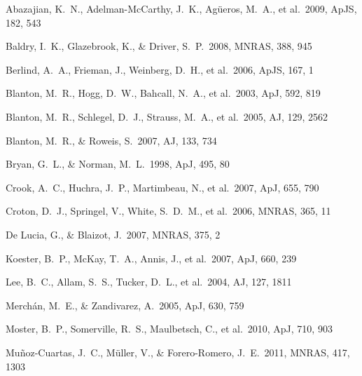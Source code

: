 \documentclass[useAMS,usenatbib]{mn2e}
\newcommand{\mnras}{MNRAS}
\newcommand{\apj}{ApJ}
\newcommand{\apjs}{ApJS}
\newcommand{\aj}{AJ}
\begin{document}
\begin{thebibliography}{99}

 Abazajian,
  K.~N., Adelman-McCarthy, J.~K., Ag{\"u}eros, M.~A., et al.\ 2009,
  \apjs, 182, 543

 Baldry, I.~K.,
  Glazebrook, K., \& Driver, S.~P.\ 2008, \mnras, 388, 945

 Berlind, A.~A.,
  Frieman, J., Weinberg, D.~H., et al.\ 2006, \apjs, 167, 1

 Blanton, M.~R.,
  Hogg, D.~W., Bahcall, N.~A., et al.\ 2003, \apj, 592, 819

 Blanton, M.~R.,
  Schlegel, D.~J., Strauss, M.~A., et al.\ 2005, \aj, 129, 2562

 Blanton, M.~R.,
  \& Roweis, S.\ 2007, \aj, 133, 734

 Bryan, G.~L., \&
  Norman, M.~L.\ 1998, \apj, 495, 80

 Crook, A.~C.,
  Huchra, J.~P., Martimbeau, N., et al.\ 2007, \apj, 655, 790

 Croton, D.~J., Springel, 
V., White, S.~D.~M., et al.\ 2006, \mnras, 365, 11

 De Lucia, G.,
  \& Blaizot, J.\ 2007, \mnras, 375, 2

 Koester, B.~P.,
  McKay, T.~A., Annis, J., et al.\ 2007, \apj, 660, 239

 Lee, B.~C., Allam,
  S.~S., Tucker, D.~L., et al.\ 2004, \aj, 127, 1811

  Merch{\'a}n, M.~E., \& Zandivarez, A.\ 2005, \apj, 630, 759

 Moster, B.~P.,
  Somerville, R.~S., Maulbetsch, C., et al.\ 2010, \apj, 710, 903

  Mu{\~n}oz-Cuartas, J.~C., M{\"u}ller, V., \& Forero-Romero,
  J.~E.\ 2011, \mnras, 417, 1303


\end{thebibliography}
\end{document}

